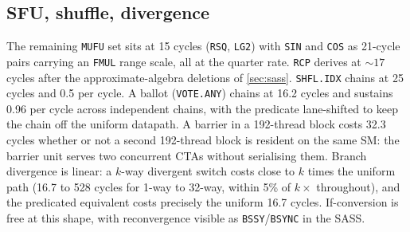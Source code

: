 \begin{table}[t]
\centering
\caption{Tensor-core rows. The f32-accumulate rate equals the
f16-accumulate rate on this Quadro-positioned part. The half-rate figure
in circulation describes GeForce-positioned TU102s.}
\label{tab:tensor}
\small

\end{table}

\subsection{SFU, shuffle, divergence}

The remaining \texttt{MUFU} set sits at 15 cycles (\texttt{RSQ},
\texttt{LG2}) with \texttt{SIN} and \texttt{COS} as 21-cycle pairs
carrying an \texttt{FMUL} range scale, all at the quarter rate.
\texttt{RCP} derives at ${\sim}17$ cycles after the approximate-algebra
deletions of \cref{sec:sass}. \texttt{SHFL.IDX} chains at 25 cycles and
0.5 per cycle. A ballot (\texttt{VOTE.ANY}) chains at 16.2 cycles and
sustains 0.96 per cycle across independent chains, with the predicate
lane-shifted to keep the chain off the uniform datapath. A barrier in a
192-thread block costs 32.3 cycles whether or not a second 192-thread
block is resident on the same SM: the barrier unit serves two
concurrent CTAs without serialising them. Branch divergence is linear:
a $k$-way divergent switch costs close to $k$ times the uniform path
(16.7 to 528 cycles for 1-way to 32-way, within 5\% of $k\times$
throughout), and the predicated equivalent
costs precisely the uniform 16.7 cycles. If-conversion is free at this
shape, with reconvergence visible as \texttt{BSSY}/\texttt{BSYNC} in the
SASS.
